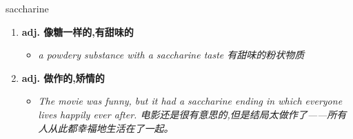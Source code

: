 
\begin{frame}
{\huge saccharine}
\begin{center}
\begin{enumerate}\Large
  \item \textbf{adj. 像糖一样的,有甜味的}
  \begin{itemize}
    \item \em{\Large{a powdery substance with a saccharine taste 有甜味的粉状物质}}
  \end{itemize}
  \item \textbf{adj. 做作的,矫情的}
  \begin{itemize}
    \item \em{\Large{The movie was funny, but it had a saccharine ending in which everyone lives happily ever after. 电影还是很有意思的,但是结局太做作了——所有人从此都幸福地生活在了一起。}}
  \end{itemize}
\end{enumerate}
\end{center}
\end{frame}
